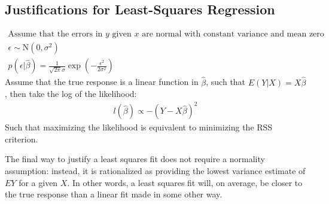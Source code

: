 \documentclass[11pt,a4paper,article]{memoir} %
\begin{document}
\subsection{Justifications for Least-Squares Regression}
\begin{gather}
	\text{Assume that the errors in $y$ given $x$ are normal with constant variance and mean zero}\\
	\epsilon \sim \text{N}(0, \sigma^2) \\
	p(\epsilon|\hat{\beta}) = \frac{1}{\sqrt{2\pi}\sigma} \exp (-\frac{\epsilon^2}{2\sigma^2})
\end{gather}
Assume that the true response is a linear function in $\hat{\beta}$, such that $E(Y|X) = X\hat{\beta}$, then take the log of the likelihood:
\begin{gather}
	l(\hat{\beta}) \propto -(Y - X\hat{\beta})^2
\end{gather}
Such that maximizing the likelihood is equivalent to minimizing the RSS criterion.

The final way to justify a least squares fit does not require a normality assumption: instead, it is rationalized as providing the lowest variance estimate of $EY$ for a given $X$. In other words, a least squares fit will, on average, be closer to the true response than a linear fit made in some other way.
\end{document}

